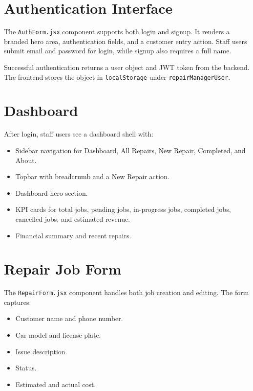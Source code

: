 \documentclass[12pt,a4paper]{report}
\begin{document}
\section{Authentication Interface}

The \texttt{AuthForm.jsx} component supports both login and signup. It renders a branded hero area, authentication fields, and a customer entry action. Staff users submit email and password for login, while signup also requires a full name.

Successful authentication returns a user object and JWT token from the backend. The frontend stores the object in \texttt{localStorage} under \texttt{repairManagerUser}.

\section{Dashboard}

After login, staff users see a dashboard shell with:

\begin{itemize}
  \item Sidebar navigation for Dashboard, All Repairs, New Repair, Completed, and About.
  \item Topbar with breadcrumb and a New Repair action.
  \item Dashboard hero section.
  \item KPI cards for total jobs, pending jobs, in-progress jobs, completed jobs, cancelled jobs, and estimated revenue.
  \item Financial summary and recent repairs.
\end{itemize}

\section{Repair Job Form}

The \texttt{RepairForm.jsx} component handles both job creation and editing. The form captures:

\begin{itemize}
  \item Customer name and phone number.
  \item Car model and license plate.
  \item Issue description.
  \item Status.
  \item Estimated and actual cost.
\end{itemize}
\end{document}
